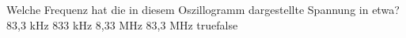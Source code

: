     {Welche Frequenz hat die in diesem Oszillogramm dargestellte Spannung in etwa?}
    {83,3 kHz}
    {833 kHz}
    {8,33 MHz}
    {83,3 MHz}
    {true}{false}
